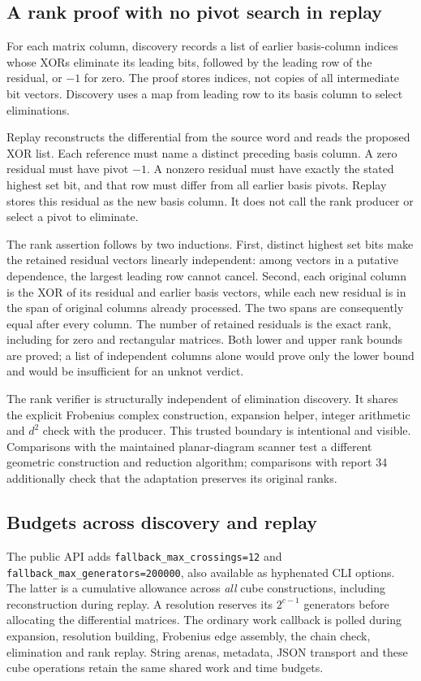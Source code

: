 \subsection{A rank proof with no pivot search in replay}

For each matrix column, discovery records a list of earlier basis-column
indices whose XORs eliminate its leading bits, followed by the leading row
of the residual, or $-1$ for zero. The proof stores indices, not copies of all
intermediate bit vectors. Discovery uses a map from leading row to its basis
column to select eliminations.

Replay reconstructs the differential from the source word and reads the
proposed XOR list. Each reference must name a distinct preceding basis
column. A zero residual must have pivot $-1$. A nonzero residual must have
exactly the stated highest set bit, and that row must differ from all earlier
basis pivots. Replay stores this residual as the new basis column. It does
not call the rank producer or select a pivot to eliminate.

The rank assertion follows by two inductions. First, distinct highest set
bits make the retained residual vectors linearly independent: among vectors
in a putative dependence, the largest leading row cannot cancel. Second,
each original column is the XOR of its residual and earlier basis vectors,
while each new residual is in the span of original columns already processed.
The two spans are consequently equal after every column. The number of
retained residuals is the exact rank, including for zero and rectangular
matrices. Both lower and upper rank bounds are proved; a list of independent
columns alone would prove only the lower bound and would be insufficient for
an unknot verdict.

The rank verifier is structurally independent of elimination discovery.
It shares the explicit Frobenius complex construction, expansion helper,
integer arithmetic and $d^2$ check with the producer. This trusted boundary is
intentional and visible. Comparisons with the maintained planar-diagram
scanner test a different geometric construction and reduction algorithm;
comparisons with report 34 additionally check that the adaptation preserves
its original ranks.

\subsection{Budgets across discovery and replay}

The public API adds \texttt{fallback\_max\_crossings=12} and
\texttt{fallback\_max\_generators=200000}, also available as hyphenated CLI
options. The latter is a cumulative allowance across \emph{all} cube
constructions, including reconstruction during replay. A resolution reserves
its $2^{c-1}$ generators before allocating the differential matrices.
The ordinary work callback is polled during expansion, resolution building,
Frobenius edge assembly, the chain check, elimination and rank replay.
String arenas, metadata, JSON transport and these cube operations retain the
same shared work and time budgets.

